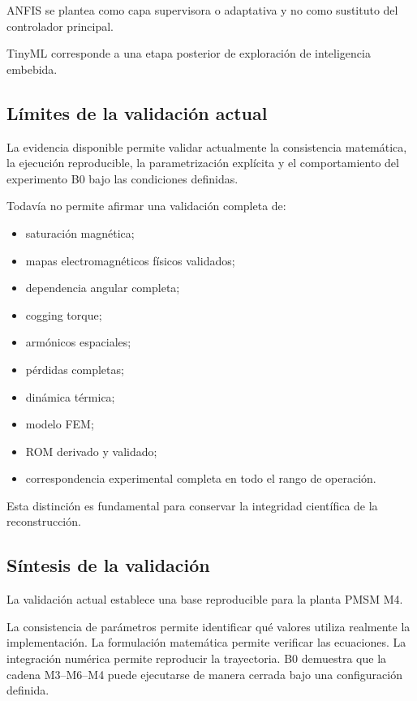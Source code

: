 ANFIS se plantea como capa supervisora o adaptativa y no como sustituto del controlador principal.

TinyML corresponde a una etapa posterior de exploración de inteligencia embebida.

\subsection{Límites de la validación actual}

La evidencia disponible permite validar actualmente la consistencia matemática, la ejecución reproducible, la parametrización explícita y el comportamiento del experimento B0 bajo las condiciones definidas.

Todavía no permite afirmar una validación completa de:

\begin{itemize}
    \item saturación magnética;
    \item mapas electromagnéticos físicos validados;
    \item dependencia angular completa;
    \item cogging torque;
    \item armónicos espaciales;
    \item pérdidas completas;
    \item dinámica térmica;
    \item modelo FEM;
    \item ROM derivado y validado;
    \item correspondencia experimental completa en todo el rango de operación.
\end{itemize}

Esta distinción es fundamental para conservar la integridad científica de la reconstrucción.

\subsection{Síntesis de la validación}

La validación actual establece una base reproducible para la planta PMSM M4.

La consistencia de parámetros permite identificar qué valores utiliza realmente la implementación. La formulación matemática permite verificar las ecuaciones. La integración numérica permite reproducir la trayectoria. B0 demuestra que la cadena M3--M6--M4 puede ejecutarse de manera cerrada bajo una configuración definida.

